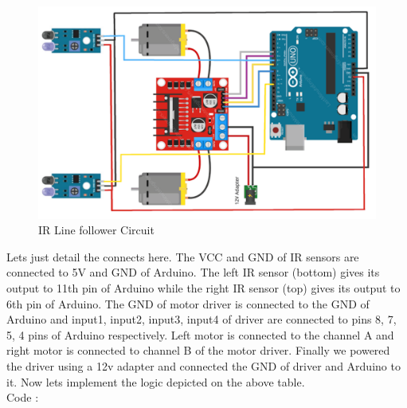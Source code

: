 \begin{figure}
    \centering
    \includegraphics{Chapters/images/IR_linefollower_circuit.png}
     \caption{IR Line follower Circuit}
\end{figure}
\vspace{1cm}
Lets just detail the connects here. The VCC and GND of IR sensors are connected to 5V and GND of Arduino. The left IR sensor (bottom) gives its output to 11th pin of Arduino while the right IR sensor (top) gives its output to 6th pin of Arduino. The GND of motor driver is connected to the GND of Arduino and input1, input2, input3, input4 of driver are connected to pins 8, 7, 5, 4 pins of Arduino respectively. Left motor is connected to the channel A and right motor is connected to channel B of the motor driver. Finally we powered the driver using a 12v adapter and connected the GND of driver and Arduino to it. Now lets implement the logic depicted on the above table.
\vspace{0.5cm}
\\ Code :
